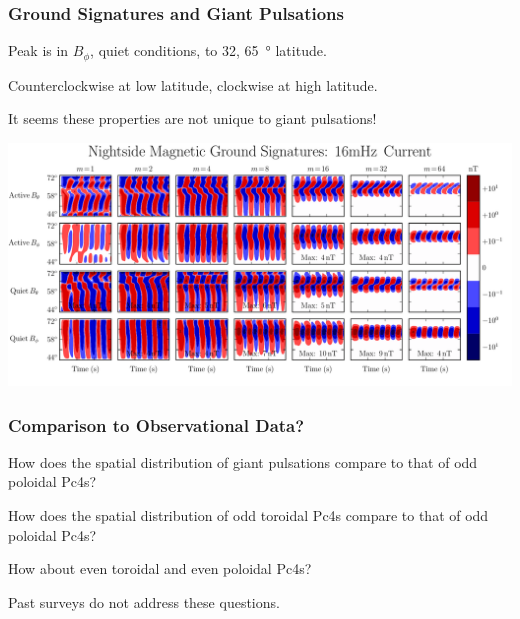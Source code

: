 \documentclass{beamer}
\begin{document}
\begin{frame}
\frametitle{Ground Signatures and Giant Pulsations}

\begin{wideitemize}
\item Peak is in $B_\phi$, quiet conditions,  to 32, \about\SI{65}{\degree} latitude. 
\item Counterclockwise at low latitude, clockwise at high latitude. 
\item It seems these properties are not unique to giant pulsations! 
\end{wideitemize}

\vfill

\includegraphics[width=\textwidth]{figures/ground_night.pdf}%

\end{frame}


\begin{frame}
\frametitle{Comparison to Observational Data?}

\begin{wideitemize}
\item How does the spatial distribution of giant pulsations compare to that of odd poloidal Pc4s?
\item How does the spatial distribution of odd toroidal Pc4s compare to that of odd poloidal Pc4s?
\item How about even toroidal and even poloidal Pc4s?
\item Past surveys do not address these questions.  
\end{wideitemize}

\end{frame}
\end{document}
